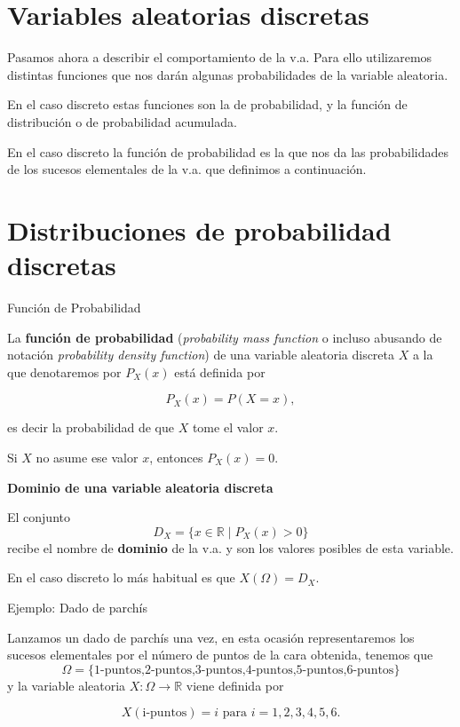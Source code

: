 \documentclass[
  letterpaper,
  DIV=11,
  numbers=noendperiod]{scrreprt}
\begin{document}
\section{Variables aleatorias
discretas}\label{variables-aleatorias-discretas}

Pasamos ahora a describir el comportamiento de la v.a. Para ello
utilizaremos distintas funciones que nos darán algunas probabilidades de
la variable aleatoria.

En el caso discreto estas funciones son la de probabilidad, y la función
de distribución o de probabilidad acumulada.

En el caso discreto la función de probabilidad es la que nos da las
probabilidades de los sucesos elementales de la v.a. que definimos a
continuación.

\section{Distribuciones de probabilidad
discretas}\label{distribuciones-de-probabilidad-discretas}

Función de Probabilidad

La \textbf{función de probabilidad} (\emph{probability mass function} o
incluso abusando de notación \emph{probability density function}) de una
variable aleatoria discreta \(X\) a la que denotaremos por \(P_{X}(x)\)
está definida por

\[P_{X}(x)=P(X=x),\]

es decir la probabilidad de que \(X\) tome el valor \(x\).

Si \(X\) no asume ese valor \(x\), entonces \(P_{X}(x)=0\).

\textbf{Dominio de una variable aleatoria discreta}

El conjunto \[D_X=\{ x\in\mathbb{R} \mid P_X(x)>0\}\] recibe el nombre
de \textbf{dominio} de la v.a. y son los valores posibles de esta
variable.

En el caso discreto lo más habitual es que \(X(\Omega)=D_X\).

Ejemplo: Dado de parchís

Lanzamos un dado de parchís una vez, en esta ocasión representaremos los
sucesos elementales por el número de puntos de la cara obtenida, tenemos
que
\[\Omega=\{\mbox{1-puntos,2-puntos,3-puntos,4-puntos,5-puntos,6-puntos}\}\]
y la variable aleatoria \(X:\Omega\to \mathbb{R}\) viene definida por

\[X(\mbox{i-puntos})=i\mbox{ para } i=1,2,3,4,5,6.\]
\end{document}
